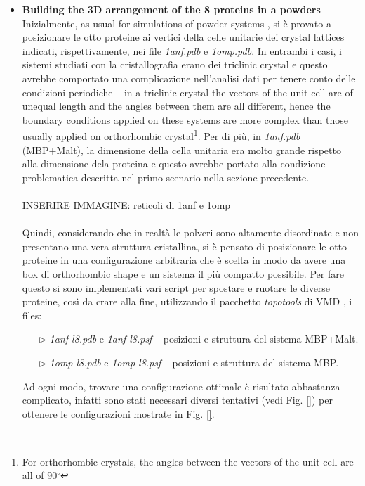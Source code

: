 \begin{itemize}
\item \textbf{Building the 3D arrangement of the 8 proteins in a powders}\\
Inizialmente, as usual for simulations of powder systems \cite{rahaman2017configurational}, si è provato a posizionare le otto proteine ai vertici della celle unitarie dei crystal lattices indicati, rispettivamente, nei file \textit{1anf.pdb} e \textit{1omp.pdb}. In entrambi i casi, i sistemi studiati con la cristallografia erano dei triclinic crystal e questo avrebbe comportato una complicazione nell'analisi dati per tenere conto delle condizioni periodiche -- in a triclinic crystal the vectors of the unit cell are of unequal length and the angles between them are all different, hence the boundary conditions applied on these systems are more complex than those usually applied on orthorhombic crystal\footnote{For orthorhombic crystals, the angles between the vectors of the unit cell are all of 90$^\circ$}. Per di più, in \textit{1anf.pdb} (MBP+Malt), la dimensione della cella unitaria era molto grande rispetto alla dimensione dela proteina e questo avrebbe portato alla condizione problematica descritta nel primo scenario nella sezione precedente.\\
\\
INSERIRE IMMAGINE: reticoli di 1anf e 1omp\\
\\
Quindi, considerando che in realtà le polveri sono altamente disordinate e non presentano una vera struttura cristallina, si è pensato di posizionare le otto proteine in una configurazione arbitraria che è scelta in modo da avere una box di orthorhombic shape e un sistema il più compatto possibile. Per fare questo si sono implementati vari script per spostare e ruotare le diverse proteine, così da crare alla fine, utilizzando il pacchetto \textit{topotools} di VMD \cite{vmd-topotools}, i files:
\begin{itemize}
\item[$\triangleright$] \textit{1anf-l8.pdb} e \textit{1anf-l8.psf} -- posizioni e struttura del sistema MBP+Malt.
\item[$\triangleright$] \textit{1omp-l8.pdb} e \textit{1omp-l8.psf} -- posizioni e struttura del sistema MBP.
\end{itemize}
Ad ogni modo, trovare una configurazione ottimale è risultato abbastanza complicato, infatti sono stati necessari diversi tentativi (vedi Fig. \ref{}) per ottenere le configurazioni mostrate in Fig. \ref{}.\\
\\

\end{itemize}
